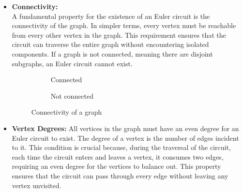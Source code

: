 \documentclass[14pt, times, a4paper]{extarticle}
\begin{document}
\begin{itemize}
    \item \textbf{Connectivity:}\\
A fundamental property for the existence of an Euler circuit is the connectivity of the graph. In simpler terms, every vertex must be reachable from every other vertex in the graph. This requirement ensures that the circuit can traverse the entire graph without encountering isolated components. If a graph is not connected, meaning there are disjoint subgraphs, an Euler circuit cannot exist.
\begin{figure}[h]
    \begin{subfigure}{0.5\textwidth}
        \centering
        \caption{Connected }
    \end{subfigure}%
    \begin{subfigure}{0.5\textwidth}
        \centering
        \caption{Not connected}
    \end{subfigure}
    \caption{Connectivity of a graph}
\end{figure}
\item \textbf{Vertex Degrees:}
All vertices in the graph must have an even degree for an Euler circuit to exist. The degree of a vertex is the number of edges incident to it. This condition is crucial because, during the traversal of the circuit, each time the circuit enters and leaves a vertex, it consumes two edges, requiring an even degree for the vertices to balance out. This property ensures that the circuit can pass through every edge without leaving any vertex unvisited.

\end{itemize}
\end{document}
